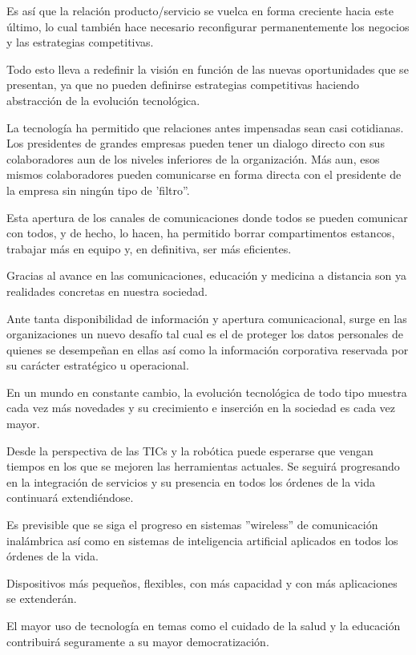\documentclass[a4paper, 12pt]{article}
\begin{document}
Es así que la relación producto/servicio se vuelca en forma creciente hacia este último, lo cual también hace necesario reconfigurar permanentemente los negocios y las estrategias competitivas.

Todo esto lleva a redefinir la visión en función de las nuevas oportunidades que se presentan, ya que no pueden definirse estrategias competitivas haciendo abstracción de la evolución tecnológica.

La tecnología ha permitido que relaciones antes impensadas sean casi cotidianas. Los presidentes de grandes empresas pueden tener un dialogo directo con sus colaboradores aun de los niveles inferiores de la organización. Más aun, esos mismos colaboradores pueden comunicarse en forma directa con el presidente de la empresa sin ningún tipo de 'filtro''.

Esta apertura de los canales de comunicaciones donde todos se pueden comunicar con todos, y de hecho, lo hacen, ha permitido borrar compartimentos estancos, trabajar más en equipo y, en definitiva, ser más eficientes.

Gracias al avance en las comunicaciones, educación y medicina a distancia son ya realidades concretas en nuestra sociedad.

Ante tanta disponibilidad de información y apertura comunicacional, surge en las organizaciones un nuevo desafío tal cual es el de proteger los datos personales de quienes se desempeñan en ellas así como la información corporativa reservada por su carácter estratégico u operacional.

En un mundo en constante cambio, la evolución tecnológica de todo tipo muestra cada vez más novedades y su crecimiento e inserción en la sociedad es cada vez mayor.

Desde la perspectiva de las TICs y la robótica puede esperarse que vengan tiempos en los que se mejoren las herramientas actuales. Se seguirá progresando en la integración de servicios y su presencia en todos los órdenes de la vida continuará extendiéndose.

Es previsible que se siga el progreso en sistemas ''wireless''  de comunicación inalámbrica así como en sistemas de inteligencia artificial aplicados en todos los órdenes de la vida.

Dispositivos más pequeños, flexibles, con más capacidad y con más aplicaciones se extenderán.

El mayor uso de tecnología en temas como el cuidado de la salud y la educación contribuirá seguramente a su mayor democratización.
\end{document}
